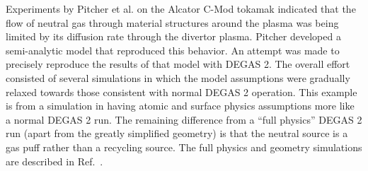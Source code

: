 \documentclass[12pt]{report}
\begin{document}
Experiments by Pitcher et al. \cite{Pitc00,Pitc01} on the Alcator C-Mod tokamak
indicated that the flow of neutral gas through material structures around
the plasma was being limited by its diffusion rate through the divertor plasma.
Pitcher \cite{Pitc01} developed a semi-analytic model that reproduced this
behavior. An attempt was made to precisely reproduce the
results of that model with DEGAS 2. The overall effort consisted of several
simulations in which the model assumptions were gradually relaxed towards those
consistent with normal DEGAS 2 operation. This example is from a simulation in
having atomic and surface physics assumptions more like a normal DEGAS 2 run.
The remaining difference from a ``full physics'' DEGAS 2 run (apart from the
greatly simplified geometry) is that the neutral source is a gas puff rather
than a recycling source. The full physics and geometry simulations are described 
in Ref.~\cite{Stot01}.
\end{document}
